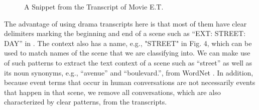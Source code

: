 \begin{figure}[th]
\centering
{}
\caption{A Snippet from the Transcript of Movie E.T.}
\label{fig:ET}
\end{figure}

The advantage of using drama transcripts here is that most of them have 
clear delimiters marking the beginning and end of a scene 
such as ``EXT: STREET: DAY'' in . 
The context also has a name, e.g., "STREET" in Fig. 4,
which can be used to match names of the scene that we are classifying into.
We can make use of such patterns to extract the text context of a scene such
as ``street'' as well as its noun synonyms,  e.g., ``avenue'' and 
``boulevard.'', from WordNet \cite{miller1995wordnet}.
In addition, because event terms that occur in human conversations 
are not necessarily events that happen in that scene, 
we remove all conversations, which are also characterized by clear patterns,
from the transcripts.

%



